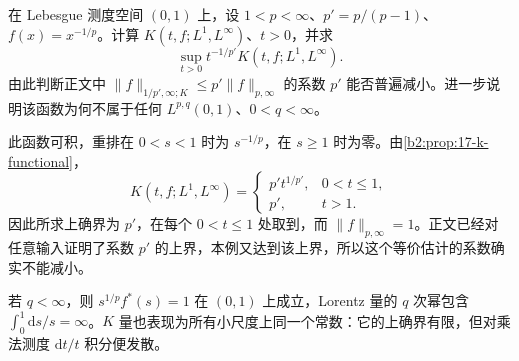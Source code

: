 \begin{exercise}\label{b2:ex:17-new-8}
在 Lebesgue 测度空间 \((0,1)\) 上，设 \(1<p<\infty\)、\(p'=p/(p-1)\)、\(f(x)=x^{-1/p}\)。计算 \(K(t,f;L^1,L^\infty)\)、\(t>0\)，并求
\[
 \sup_{t>0}t^{-1/p'}K(t,f;L^1,L^\infty).
\]
由此判断正文中 \(\|f\|_{1/p',\infty;K}\leq p'\|f\|_{p,\infty}\) 的系数 \(p'\) 能否普遍减小。进一步说明该函数为何不属于任何 \(L^{p,q}(0,1)\)、\(0<q<\infty\)。
\end{exercise}
\begin{solution}
此函数可积，重排在 \(0<s<1\) 时为 \(s^{-1/p}\)，在 \(s\geq1\) 时为零。由\cref{b2:prop:17-k-functional}，
\[
 K(t,f;L^1,L^\infty)=
 \begin{cases}
 p't^{1/p'},&0<t\leq1,\\
 p',&t>1.
 \end{cases}
\]
因此所求上确界为 \(p'\)，在每个 \(0<t\leq1\) 处取到，而 \(\|f\|_{p,\infty}=1\)。正文已经对任意输入证明了系数 \(p'\) 的上界，本例又达到该上界，所以这个等价估计的系数确实不能减小。

若 \(q<\infty\)，则 \(s^{1/p}f^*(s)=1\) 在 \((0,1)\) 上成立，Lorentz 量的 \(q\) 次幂包含 \(\int_0^1\mathrm ds/s=\infty\)。\(K\) 量也表现为所有小尺度上同一个常数：它的上确界有限，但对乘法测度 \(\mathrm dt/t\) 积分便发散。
\end{solution}
